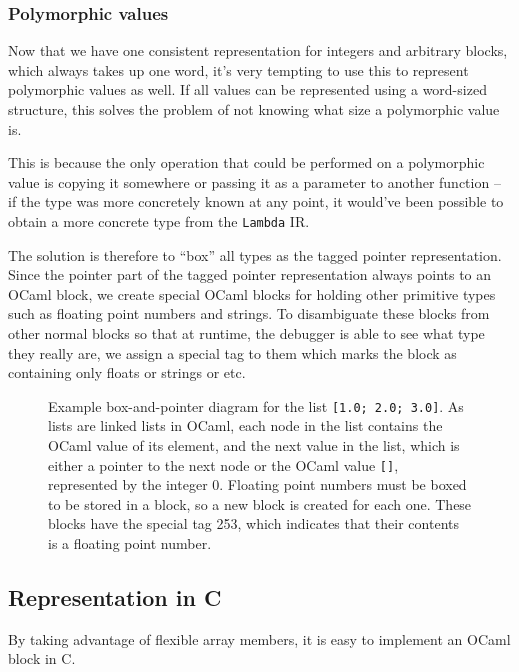 \documentclass[12pt,a4paper,twoside,openright]{report}
\begin{document}
\subsubsection{Polymorphic values}

Now that we have one consistent representation for integers and arbitrary 
blocks, which always takes up one word, it's very tempting to use this to 
represent polymorphic values as well. If all values can be represented using a 
word-sized structure, this solves the problem of not knowing what size a 
polymorphic value is.

This is because the only operation that could be performed on a polymorphic 
value is copying it somewhere or passing it as a parameter to another function 
-- if the type was more concretely known at any point, it would've been 
possible to obtain a more concrete type from the \texttt{Lambda} IR.

The solution is therefore to ``box'' all types as the tagged pointer 
representation. Since the pointer part of the tagged pointer representation 
always points to an OCaml block, we create special OCaml blocks for holding 
other primitive types such as floating point numbers and strings. To 
disambiguate these blocks from other normal blocks so that at runtime, the 
debugger is able to see what type they really are, we assign a special tag to 
them which marks the block as containing only floats or strings or etc.

\begin{figure}
    \label{fig:block-example}
    \centering
    
    \caption{Example box-and-pointer diagram for the list \texttt{[1.0; 2.0; 
    3.0]}. As lists are linked lists in OCaml, each node in the list contains 
    the OCaml value of its element, and the next value in the list, which is 
    either a pointer to the next node or the OCaml value \texttt{[]}, 
    represented by the integer 0. Floating point numbers must be boxed to be 
    stored in a block, so a new block is created for each one. These blocks 
    have the special tag 253, which indicates that their contents is a floating 
    point number.}
\end{figure}

\subsection{Representation in C} \label{c-repr}

By taking advantage of flexible array members, it is easy to implement an OCaml 
block in C.
\end{document}

